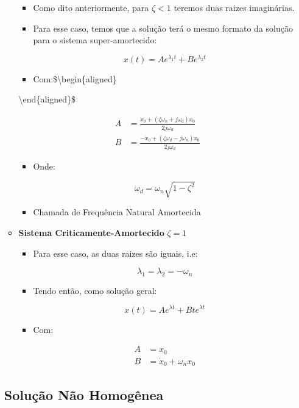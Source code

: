 \documentclass{article}
\begin{document}
\begin{itemize}
\begin{itemize}
  \begin{itemize}
  \item
    Como dito anteriormente, para \(\zeta < 1\) teremos duas raizes
    imaginárias.
  \item
    Para esse caso, temos que a solução terá o mesmo formato da solução
    para o sistema super-amortecido:

    \[
      x(t) = Ae^{\lambda_1t} + Be^{\lambda_2t}
      \]
  \item
    Com:\$\textbackslash begin\{aligned\}
  \end{itemize}

  \textbackslash end\{aligned\}\$

  \[
    \begin{aligned}
    A &= \frac{\dot x_0 + (\zeta \omega _n + j \omega_d)x_0}{2j\omega_d} \\
    B &= \frac{-\dot x_0 + (\zeta \omega _d - j \omega_n)x_0}{2j\omega_d}
    \end{aligned}
    \]

  \begin{itemize}
  \item
    Onde:

    \[
      \omega_d = \omega_n\sqrt{1-\zeta^2}
      \]
  \item
    Chamada de Frequência Natural Amortecida
  \end{itemize}
\item
  \textbf{Sistema Criticamente-Amortecido} \(\zeta = 1\)

  \begin{itemize}
  \item
    Para esse caso, as duas raizes são iguais, i.e:

    \[
      \lambda_1 = \lambda_2 = -\omega_n
      \]
  \item
    Tendo então, como solução geral:

    \[
      x(t) = Ae^{\lambda t} + Bte^{\lambda t}
      \]
  \item
    Com:

    \[
      \begin{aligned}
      A &= x_0 \\ 
      B &= \dot x_0 + \omega_n x_0
      \end{aligned}
      \]
  \end{itemize}
\end{itemize}

\hypertarget{soluuxe7uxe3o-nuxe3o-homoguxeanea-1}{%
\subsection{Solução Não
Homogênea}\label{soluuxe7uxe3o-nuxe3o-homoguxeanea-1}}


\end{itemize}
\end{document}
